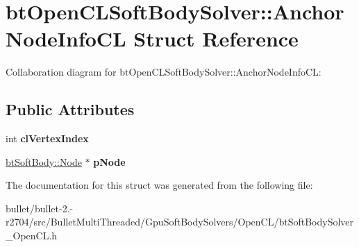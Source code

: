 \hypertarget{structbt_open_c_l_soft_body_solver_1_1_anchor_node_info_c_l}{\section{bt\+Open\+C\+L\+Soft\+Body\+Solver\+:\+:Anchor\+Node\+Info\+C\+L Struct Reference}
\label{structbt_open_c_l_soft_body_solver_1_1_anchor_node_info_c_l}
}


Collaboration diagram for bt\+Open\+C\+L\+Soft\+Body\+Solver\+:\+:Anchor\+Node\+Info\+C\+L\+:
\subsection*{Public Attributes}
\begin{DoxyCompactItemize}
\item 
\hypertarget{structbt_open_c_l_soft_body_solver_1_1_anchor_node_info_c_l_a909d1b22b64cc35a3ccc083a587c6c71}{int {\bfseries cl\+Vertex\+Index}}\label{structbt_open_c_l_soft_body_solver_1_1_anchor_node_info_c_l_a909d1b22b64cc35a3ccc083a587c6c71}

\item 
\hypertarget{structbt_open_c_l_soft_body_solver_1_1_anchor_node_info_c_l_a06541a75040c0fd3080bc79cebc8b618}{\hyperlink{structbt_soft_body_1_1_node}{bt\+Soft\+Body\+::\+Node} $\ast$ {\bfseries p\+Node}}\label{structbt_open_c_l_soft_body_solver_1_1_anchor_node_info_c_l_a06541a75040c0fd3080bc79cebc8b618}

\end{DoxyCompactItemize}


The documentation for this struct was generated from the following file\+:\begin{DoxyCompactItemize}
\item 
bullet/bullet-\/2.-\/r2704/src/\+Bullet\+Multi\+Threaded/\+Gpu\+Soft\+Body\+Solvers/\+Open\+C\+L/bt\+Soft\+Body\+Solver\+\_\+\+Open\+C\+L.\+h\end{DoxyCompactItemize}
